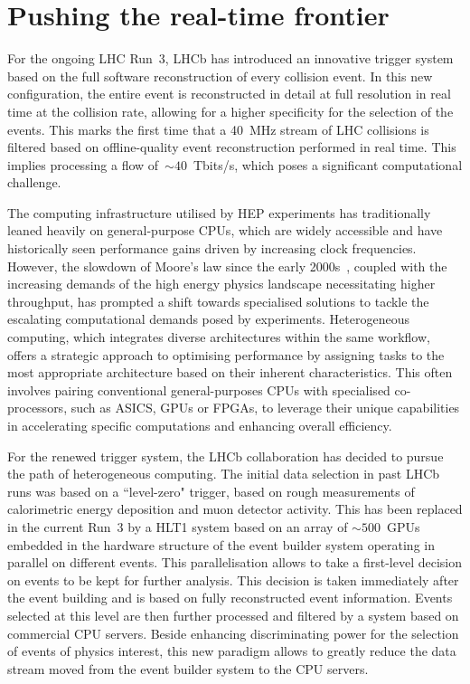 


\section{Pushing the real-time frontier}
For the ongoing LHC Run~3, LHCb has introduced an innovative trigger system based on the full software reconstruction of every collision event. In this new configuration, the entire event is reconstructed in detail at full resolution in real time at the collision rate, allowing for a higher specificity for the selection of the events. This marks the first time that a \SI{40}{\mega\hertz} stream of LHC collisions is filtered based on offline-quality event reconstruction performed in real time. This implies processing a flow of~$\sim 40$~Tbits/s, which poses a significant computational challenge. 

The computing infrastructure utilised by HEP experiments has traditionally leaned heavily on general-purpose CPUs, which are widely accessible and have historically seen performance gains driven by increasing clock frequencies. However, the slowdown of Moore's law since the early 2000s~\cite{Tuomi_2002}, coupled with the increasing demands of the high energy physics landscape necessitating higher throughput, has prompted a shift towards specialised solutions to tackle the escalating computational demands posed by experiments. Heterogeneous computing, which integrates diverse architectures within the same workflow, offers a strategic approach to optimising performance by assigning tasks to the most appropriate architecture based on their inherent characteristics. This often involves pairing conventional general-purposes CPUs with specialised co-processors, such as ASICS, GPUs or FPGAs, to leverage their unique capabilities in accelerating specific computations and enhancing overall efficiency.

For the renewed trigger system, the LHCb collaboration has decided to pursue the path of heterogeneous computing. The initial data selection in past LHCb runs was based on a ``level-zero" trigger, based on rough measurements of calorimetric energy deposition and muon detector activity. This has been replaced in the current Run~3 by a HLT1 system based on an array of $\sim 500$~GPUs embedded in the hardware structure of the event builder system operating in parallel on different events. This parallelisation allows to take a first-level decision on events to be kept for further analysis. This decision is taken immediately after the event building and is based on fully reconstructed event information. Events selected at this level are then further processed and filtered by a system based on commercial CPU servers. Beside enhancing discriminating power for the selection of events of physics interest, this new paradigm allows to greatly reduce the data stream moved from the event builder system to the CPU servers. 

